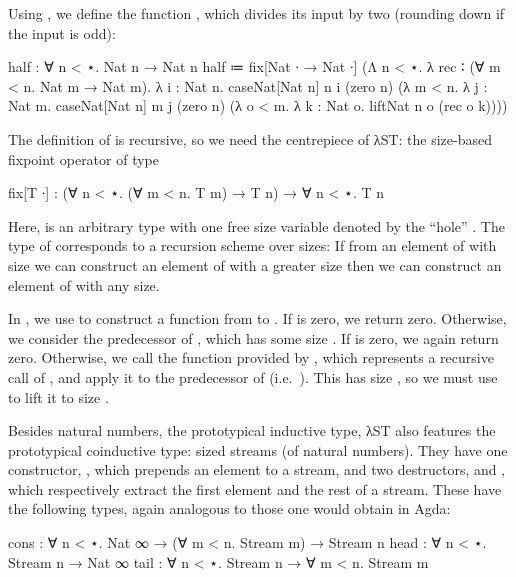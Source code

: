 Using , we define the function , which divides its
input by two (rounding down if the input is odd):
\begin{code}
  half : ∀ n < ⋆. Nat n → Nat n
  half ≔ fix[Nat ∙ → Nat ∙]
          (Λ n < ⋆. λ rec ∶ (∀ m < n. Nat m → Nat m). λ i : Nat n.
            caseNat[Nat n] n i
              (zero n)
              (λ m < n. λ j : Nat m. caseNat[Nat n] m j
                (zero n)
                (λ o < m. λ k : Nat o. liftNat n o (rec o k))))
\end{code}
The definition of  is recursive, so we need the centrepiece of λST:
the size-based fixpoint operator  of type
\begin{code}
  fix[T ∙] : (∀ n < ⋆. (∀ m < n. T m) → T n) → ∀ n < ⋆. T n
\end{code}
Here,  is an arbitrary type with one free size variable denoted by the
\enquote{hole} . The type of  corresponds to a recursion
scheme over sizes: If from an element of  with size  we can
construct an element of  with a greater size  then we can
construct an element of  with any size.

In , we use  to construct a function from  to . If  is zero, we return zero. Otherwise, we
consider the predecessor  of , which has some size . If  is zero, we again return zero. Otherwise, we call the
function  provided by , which represents a recursive call
of , and apply it to the predecessor of  (i.e.\ ). This has size , so we must use  to lift it to
size .

Besides natural numbers, the prototypical inductive type, λST also features
the prototypical coinductive type: sized streams (of natural numbers). They have
one constructor, , which prepends an element to a stream, and two
destructors,  and , which respectively extract the first
element and the rest of a stream. These have the following types, again analogous
to those one would obtain in Agda:
\begin{code}
  cons : ∀ n < ⋆. Nat ∞ → (∀ m < n. Stream m) → Stream n
  head : ∀ n < ⋆. Stream n → Nat ∞
  tail : ∀ n < ⋆. Stream n → ∀ m < n. Stream m
\end{code}

